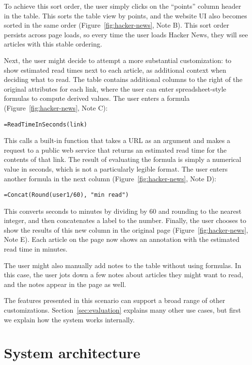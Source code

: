 \documentclass[sigplan,screen,10pt,anonymous,review]{acmart}
\begin{document}
To achieve this sort order, the user simply clicks on the ``points''
column header in the table. This sorts the table view by points, and the
website UI also becomes sorted in the same order
(Figure~\ref{fig:hacker-news}, Note B). This sort order persists across
page loads, so every time the user loads Hacker News, they will see
articles with this stable ordering.

Next, the user might decide to attempt a more substantial customization:
to show estimated read times next to each article, as additional context
when deciding what to read. The table contains additional columns to the
right of the original attributes for each link, where the user can enter
spreadsheet-style formulas to compute derived values. The user enters a
formula (Figure~\ref{fig:hacker-news}, Note C):

\begin{verbatim}
=ReadTimeInSeconds(link)
\end{verbatim}

This calls a built-in function that takes a URL as an argument and makes
a request to a public web service that returns an estimated read time
for the contents of that link. The result of evaluating the formula is
simply a numerical value in seconds, which is not a particularly legible
format. The user enters another formula in the next column
(Figure~\ref{fig:hacker-news}, Note D):

\begin{verbatim}
=Concat(Round(user1/60), "min read")
\end{verbatim}

This converts seconds to minutes by dividing by 60 and rounding to the
nearest integer, and then concatenates a label to the number. Finally,
the user chooses to show the results of this new column in the original
page (Figure~\ref{fig:hacker-news}, Note E). Each article on the page
now shows an annotation with the estimated read time in minutes.

The user might also manually add notes to the table without using
formulas. In this case, the user jots down a few notes about articles
they might want to read, and the notes appear in the page as well.

The features presented in this scenario can support a broad range of
other customizations. Section~\ref{sec:evaluation} explains many other
use cases, but first we explain how the system works internally.

\hypertarget{sec:architecture}{%
\section{System architecture}\label{sec:architecture}}
\end{document}

